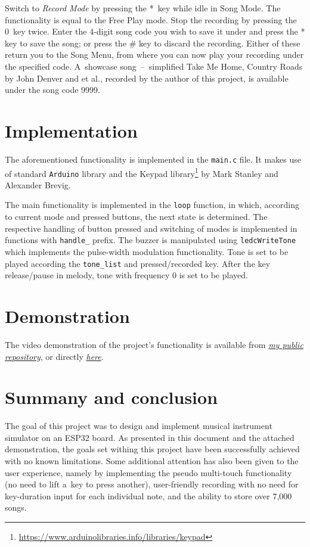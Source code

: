 \documentclass[a4paper, 11pt, twocolumn]{article}
\begin{document}
    Switch to \textit{Record Mode} by pressing the *~key while idle in Song Mode. The functionality is equal to the Free Play mode. Stop the recording by pressing the 0~key twice. Enter the 4-digit song code you wish to save it under and press the * key to save the song; or press the \# key to discard the recording. Either of these return you to the Song Menu, from where you can now play your recording under the specified code. A~showcase song~--~simplified Take Me Home, Country Roads by John Denver and et al., recorded by the author of this project, is available under the song code 9999.

        
\section{Implementation}
    The aforementioned functionality is implemented in the \texttt{main.c} file. It makes use of standard \texttt{Arduino} library and the Keypad library\footnote{\url{https://www.arduinolibraries.info/libraries/keypad}} by Mark Stanley and Alexander Brevig.
    
    The main functionality is implemented in the \texttt{loop} function, in which, according to current mode and pressed buttons, the next state is determined. The respective handling of button pressed and switching of modes is implemented in functions with \texttt{handle\_} prefix. The buzzer is manipulated using \texttt{ledcWriteTone} which implements the pulse-width modulation functionality. Tone is set to be played according the \texttt{tone\_list} and pressed/recorded key. After the key release/pause in melody, tone with frequency 0 is set to be played.
        
\section{Demonstration}
    The video demonstration of the project's functionality is available from \href{https://github.com/bix-1/IMP}{\textit{my public repository}}, or directly \href{https://user-images.githubusercontent.com/61697719/146260228-3d847d57-f754-4025-8446-bd0458d8adeb.mp4}{\textit{here}}.
        
\section{Summany and conclusion}
    The goal of this project was to design and implement musical instrument simulator on an ESP32 board. As presented in this document and the attached demonstration, the goals set withing this project have been successfully achieved with no known limitations. Some additional attention has also been given to the user experience, namely by implementing the pseudo multi-touch functionality (no need to lift a~key to press another), user-friendly recording with no need for key-duration input for each individual note, and the ability to store over 7,000 songs.
        
\end{document}
